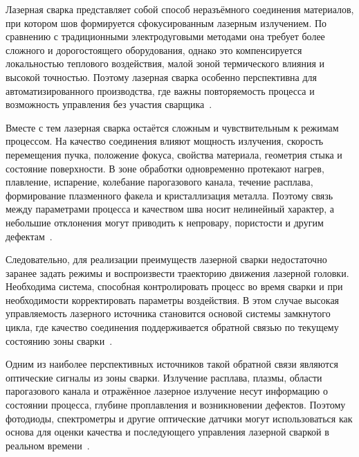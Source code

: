 \startprefacepage

Лазерная сварка представляет собой способ неразъёмного соединения материалов, при котором шов формируется сфокусированным лазерным излучением. По сравнению с традиционными электродуговыми методами она требует более сложного и дорогостоящего оборудования, однако это компенсируется локальностью теплового воздействия, малой зоной термического влияния и высокой точностью. Поэтому лазерная сварка особенно перспективна для автоматизированного производства, где важны повторяемость процесса и возможность управления без участия сварщика~\cite{wu2022progress,huang2025laser}.

Вместе с тем лазерная сварка остаётся сложным и чувствительным к режимам процессом. На качество соединения влияют мощность излучения, скорость перемещения пучка, положение фокуса, свойства материала, геометрия стыка и состояние поверхности. В зоне обработки одновременно протекают нагрев, плавление, испарение, колебание парогазового канала, течение расплава, формирование плазменного факела и кристаллизация металла. Поэтому связь между параметрами процесса и качеством шва носит нелинейный характер, а небольшие отклонения могут приводить к непровару, пористости и другим дефектам~\cite{huang2025laser,wu2022progress}.

Следовательно, для реализации преимуществ лазерной сварки недостаточно заранее задать режимы и воспроизвести траекторию движения лазерной головки. Необходима система, способная контролировать процесс во время сварки и при необходимости корректировать параметры воздействия. В этом случае высокая управляемость лазерного источника становится основой системы замкнутого цикла, где качество соединения поддерживается обратной связью по текущему состоянию зоны сварки~\cite{konuk2011closed,zhang2018adaptive}.

Одним из наиболее перспективных источников такой обратной связи являются оптические сигналы из зоны сварки. Излучение расплава, плазмы, области парогазового канала и отражённое лазерное излучение несут информацию о состоянии процесса, глубине проплавления и возникновении дефектов. Поэтому фотодиоды, спектрометры и другие оптические датчики могут использоваться как основа для оценки качества и последующего управления лазерной сваркой в реальном времени~\cite{konuk2011closed,huang2025laser}.

\endinput